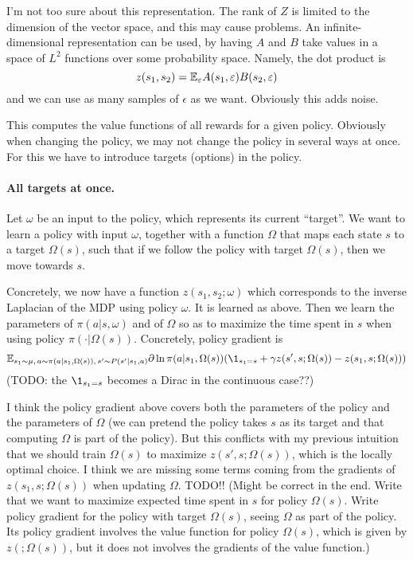 \documentclass[11pt,a4paper]{article}
\newcommand{\noise}{\epsilon}
\begin{document}
I'm not too sure about this representation. The rank of $Z$ is limited to
the dimension of the vector space, and this may cause problems. An
infinite-dimensional representation can be used, by having $A$ and $B$
take values in a space of $L^2$ functions over some probability space.
Namely, the dot product is
\begin{equation}
z(s_1,s_2)=\E_{\noise} A(s_1,\eps)B(s_2,\eps)
\end{equation}
and we can use as many samples of $\noise$ as we want. Obviously this
adds noise.

This computes the value functions of all rewards for a given policy.
Obviously when changing the policy, we may not change the policy in
several ways at once. For this we have to introduce targets (options) in
the policy.

\paragraph{All targets at once.} Let $\omega$ be an input to the policy,
which represents its current ``target''. We want to learn a policy with
input $\omega$, together with a function $\Omega$ that maps each state
$s$ to a target $\Omega(s)$, such that if we follow the policy with
target $\Omega(s)$, then we move towards $s$.

Concretely, we now have a function $z(s_1,s_2;\omega)$ which corresponds
to the inverse Laplacian of the MDP using policy $\omega$. It is learned
as above. Then we learn the parameters of $\pi(a|s,\omega)$ and of
$\Omega$ so as to maximize the time spent in $s$ when using policy
$\pi(\cdot|\Omega(s))$. Concretely, policy gradient is
\begin{equation}
\E_{s_1\sim \mu,\,a\sim \pi(a|s_1,\Omega(s)),\,s'\sim P(s'|s_1,a)}
\partial \ln \pi(a|s_1,\Omega(s))(\1_{s_1=s}+\gamma
z(s',s;\Omega(s))-z(s_1,s;\Omega(s)))
\end{equation}
(TODO: the $\1_{s_1=s}$ becomes a Dirac in the continuous case??)

I think the policy gradient above covers both the parameters of the
policy and the parameters of $\Omega$ (we can pretend the policy takes
$s$ as its target and that computing $\Omega$ is part of the policy).
But this conflicts with my previous intuition that we should train
$\Omega(s)$ to maximize $z(s',s;\Omega(s))$, which is the locally optimal
choice. I think we are missing some terms coming from the gradients of
$z(s_1,s;\Omega(s))$ when updating $\Omega$. TODO!! (Might be correct in
the end. Write that we want to maximize expected time spent in $s$ for
policy $\Omega(s)$. Write policy gradient for the policy with target $\Omega(s)$,
seeing $\Omega$ as part of the policy. Its policy gradient involves the
value function for policy $\Omega(s)$, which is given by $z(;\Omega(s))$,
but it does not involves the gradients of the value function.)
\end{document}
